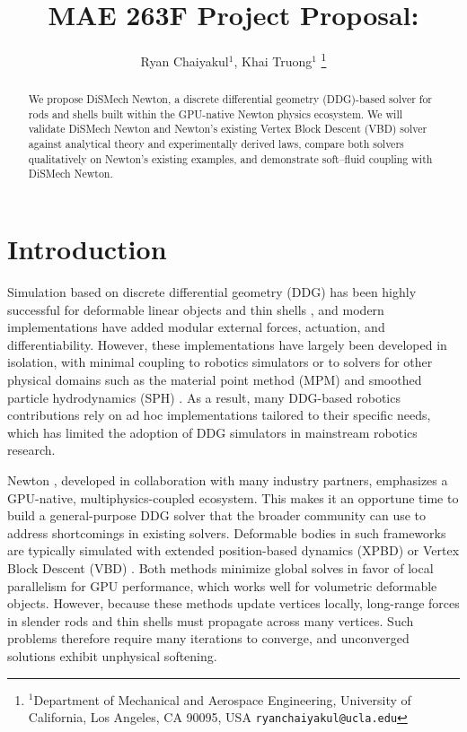 \documentclass[letterpaper, 10 pt, conference]{ieeeconf}  %
\title{\LARGE \bf
MAE 263F Project Proposal: \solver
}
\author{Ryan Chaiyakul$^{1}$, Khai Truong$^{1}$%
\thanks{$^{1}$Department of Mechanical and Aerospace Engineering,
        University of California, Los Angeles, CA 90095, USA
        {\tt\small ryanchaiyakul@ucla.edu}}%
}
\newcommand{\solver}{DiSMech Newton}
\begin{document}
\maketitle
\thispagestyle{empty}
\pagestyle{empty}


\begin{abstract}
We propose \solver, a discrete differential geometry (DDG)-based solver for rods and shells built within the GPU-native Newton physics ecosystem.
We will validate \solver{} and Newton's existing Vertex Block Descent (VBD) solver against analytical theory and experimentally derived laws, compare both solvers qualitatively on Newton's existing examples, and demonstrate soft--fluid coupling with \solver{}.
\end{abstract}

\section{Introduction}

Simulation based on discrete differential geometry (DDG) has been highly successful for deformable linear objects \cite{bergou2008der,bergou2010dvt} and thin shells \cite{grinspun2003des}, and modern implementations \cite{tekinalp2024pyelastica, choi2024dismech, lahoti2025pydismech, lahoti2026matdismech, stolzle2026soromox} have added modular external forces, actuation, and differentiability.
However, these implementations have largely been developed in isolation, with minimal coupling to robotics simulators \cite{todorov2012mujoco, gao2026nvidia} or to solvers for other physical domains such as the material point method (MPM) and smoothed particle hydrodynamics (SPH) \cite{monaghan1992sph}.
As a result, many DDG-based robotics contributions \cite{chen2024deform, chen2025deft} rely on ad hoc implementations tailored to their specific needs, which has limited the adoption of DDG simulators in mainstream robotics research.

Newton \cite{nvidia2025newton}, developed in collaboration with many industry partners, emphasizes a GPU-native, multiphysics-coupled ecosystem.
This makes it an opportune time to build a general-purpose DDG solver that the broader community can use to address shortcomings in existing solvers.
Deformable bodies in such frameworks are typically simulated with extended position-based dynamics (XPBD) \cite{macklin2016xpbd} or Vertex Block Descent (VBD) \cite{chen2024vertex}.
Both methods minimize global solves in favor of local parallelism for GPU performance, which works well for volumetric deformable objects.
However, because these methods update vertices locally, long-range forces in slender rods and thin shells must propagate across many vertices.
Such problems therefore require many iterations to converge, and unconverged solutions exhibit unphysical softening.
\end{document}
